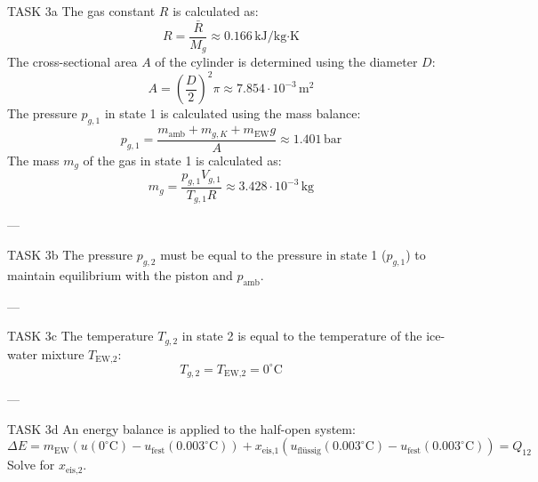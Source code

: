 TASK 3a  
The gas constant \( R \) is calculated as:  
\[
R = \frac{\bar{R}}{M_g} \approx 0.166 \, \text{kJ/kg·K}
\]  
The cross-sectional area \( A \) of the cylinder is determined using the diameter \( D \):  
\[
A = \left(\frac{D}{2}\right)^2 \pi \approx 7.854 \cdot 10^{-3} \, \text{m}^2
\]  
The pressure \( p_{g,1} \) in state 1 is calculated using the mass balance:  
\[
p_{g,1} = \frac{m_{\text{amb}} + m_{g,K} + m_{\text{EW}} g}{A} \approx 1.401 \, \text{bar}
\]  
The mass \( m_g \) of the gas in state 1 is calculated as:  
\[
m_g = \frac{p_{g,1} V_{g,1}}{T_{g,1} R} \approx 3.428 \cdot 10^{-3} \, \text{kg}
\]  

---

TASK 3b  
The pressure \( p_{g,2} \) must be equal to the pressure in state 1 (\( p_{g,1} \)) to maintain equilibrium with the piston and \( p_{\text{amb}} \).  

---

TASK 3c  
The temperature \( T_{g,2} \) in state 2 is equal to the temperature of the ice-water mixture \( T_{\text{EW,2}} \):  
\[
T_{g,2} = T_{\text{EW,2}} = 0^\circ\text{C}
\]  

---

TASK 3d  
An energy balance is applied to the half-open system:  
\[
\Delta E = m_{\text{EW}} \left( u(0^\circ\text{C}) - u_{\text{fest}}(0.003^\circ\text{C}) \right) + x_{\text{eis,1}} \left( u_{\text{flüssig}}(0.003^\circ\text{C}) - u_{\text{fest}}(0.003^\circ\text{C}) \right) = Q_{12}
\]  
Solve for \( x_{\text{eis,2}} \).  